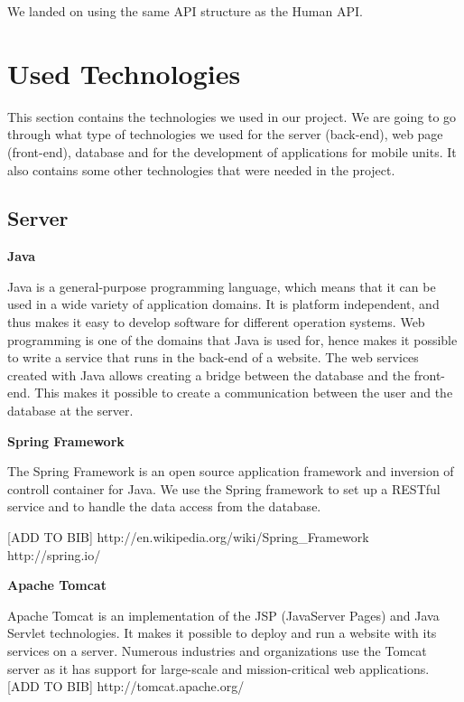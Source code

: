 We landed on using the same API structure as the Human API.


\section{Used Technologies}

This section contains the technologies we used in our project.
We are going to go through what type of technologies we used for the server (back-end), web page (front-end), database and for the development of applications for mobile units. 
It also contains some other technologies that were needed in the project.

\subsection{Server}

\textbf{Java}

Java is a general-purpose programming language, which means that it can be used in a wide variety of application domains.
It is platform independent, and thus makes it easy to develop software for different operation systems.
Web programming is one of the domains that Java is used for, hence makes it possible to write a service that runs in the back-end of a website.
The web services created with Java allows creating a bridge between the database and the front-end. 
This makes it possible to create a communication between the user and the database at the server.

\textbf{Spring Framework}

The Spring Framework is an open source application framework and inversion of controll container for Java. 
We use the Spring framework to set up a RESTful service and to handle the data access from the database. 

[ADD TO BIB] http://en.wikipedia.org/wiki/Spring_Framework
http://spring.io/

\textbf{Apache Tomcat}

Apache Tomcat is an implementation of the JSP (JavaServer Pages) and Java Servlet technologies.
It makes it possible to deploy and run a website with its services on a server.
Numerous industries and organizations use the Tomcat server as it has support for large-scale and mission-critical web applications.
[ADD TO BIB]
http://tomcat.apache.org/

